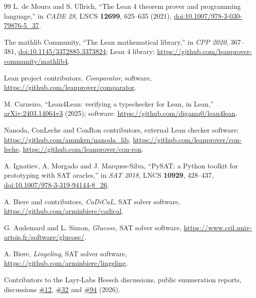 \documentclass[10pt,a4paper]{article}
\theoremstyle{definition}
\theoremstyle{remark}
\begin{document}
{\begin{thebibliography}{99}
L. de Moura and S. Ullrich,
``The Lean 4 theorem prover and programming language,''
in \emph{CADE 28}, LNCS \textbf{12699}, 625--635 (2021),
\href{https://doi.org/10.1007/978-3-030-79876-5_37}{doi:10.1007/978-3-030-79876-5\_37}.

The mathlib Community,
``The Lean mathematical library,''
in \emph{CPP 2020}, 367--381,
\href{https://doi.org/10.1145/3372885.3373824}{doi:10.1145/3372885.3373824};
Lean 4 library: \url{https://github.com/leanprover-community/mathlib4}.

Lean project contributors,
\emph{Comparator}, software,
\url{https://github.com/leanprover/comparator}.

M. Carneiro,
``Lean4Lean: verifying a typechecker for Lean, in Lean,''
\href{https://arxiv.org/abs/2403.14064v3}{arXiv:2403.14064v3} (2025);
software: \url{https://github.com/digama0/lean4lean}.

Nanoda, ConLeche and ConRon contributors,
external Lean checker software:
\url{https://github.com/ammkrn/nanoda_lib},
\url{https://github.com/leanprover/con-leche},
\url{https://github.com/leanprover/con-ron}.

A. Ignatiev, A. Morgado and J. Marques-Silva,
``PySAT: a Python toolkit for prototyping with SAT oracles,''
in \emph{SAT 2018}, LNCS \textbf{10929}, 428--437,
\href{https://doi.org/10.1007/978-3-319-94144-8_26}{doi:10.1007/978-3-319-94144-8\_26}.

A. Biere and contributors,
\emph{CaDiCaL}, SAT solver software,
\url{https://github.com/arminbiere/cadical}.

G. Audemard and L. Simon,
\emph{Glucose}, SAT solver software,
\url{https://www.cril.univ-artois.fr/software/glucose/}.

A. Biere,
\emph{Lingeling}, SAT solver software,
\url{https://github.com/arminbiere/lingeling}.

Contributors to the Layr-Labs Heesch discussions,
public enumeration reports, discussions
\href{https://github.com/Layr-Labs/heesch/discussions/12}{\#12},
\href{https://github.com/Layr-Labs/heesch/discussions/32}{\#32} and
\href{https://github.com/Layr-Labs/heesch/discussions/94}{\#94}
(2026).
\end{thebibliography}
}
\end{document}
